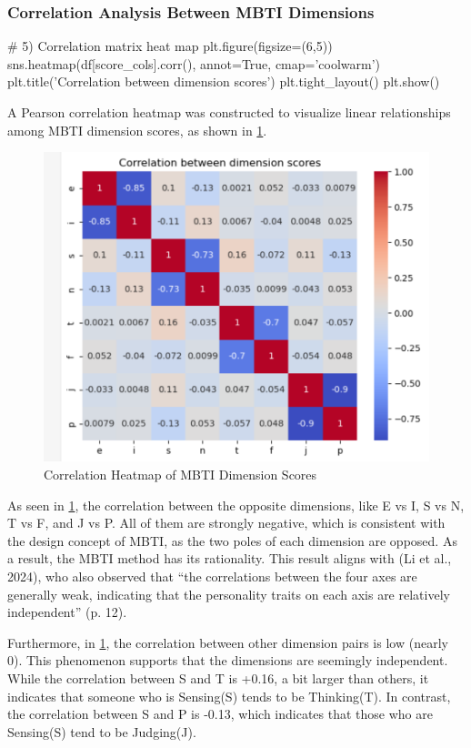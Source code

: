 \documentclass[12pt]{article}
\numberwithin{figure}{section}  %
\begin{document}
\subsubsection{Correlation Analysis Between MBTI Dimensions}
	\begin{python}
# 5) Correlation matrix heat map
plt.figure(figsize=(6,5))
sns.heatmap(df[score_cols].corr(), annot=True, cmap='coolwarm')
plt.title('Correlation between dimension scores')
plt.tight_layout()
plt.show()
	\end{python}
	A Pearson correlation heatmap was constructed to visualize linear
	relationships among MBTI dimension scores, as shown in \cref{personheatmap}.
	\begin{figure}[H]
		\centering
		\includegraphics{Q1EDA9} 
		\caption{Correlation Heatmap of MBTI Dimension Scores}	
		\label{personheatmap}	
	\end{figure}
	
	As seen in \cref{personheatmap}, the correlation between the opposite
	dimensions, like E vs I, S vs N, T vs F, and J vs P. All of them are
	strongly negative, which is consistent with the design concept of MBTI, as
	the two poles of each dimension are opposed. As a result, the MBTI method
	has its rationality. This result aligns with (Li et al., 2024), who also %
	observed that “the correlations between the four axes are generally weak,
	indicating that the personality traits on each axis are relatively
	independent” (p. 12).%
	
	Furthermore, in \cref{personheatmap}, the correlation between other dimension pairs
	is low (nearly 0). This phenomenon supports that the dimensions are
	seemingly independent. While the correlation between S and T is +0.16, a bit
	larger than others, it indicates that someone who is Sensing(S) tends to be
	Thinking(T). In contrast, the correlation between S and P is -0.13, which
	indicates that those who are Sensing(S) tend to be Judging(J).
\end{document}
